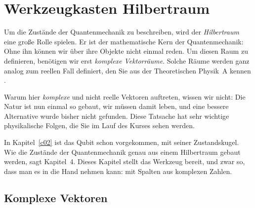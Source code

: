 %

\chapter{Werkzeugkasten Hilbertraum}\label{c03}

Um die Zustände der Quantenmechanik zu beschreiben, wird der \emph{Hilbertraum} eine große
Rolle spielen. Er ist der mathematische Kern der Quantenmechanik: Ohne ihn können wir über
ihre Objekte nicht einmal reden. Um diesen Raum zu definieren, benötigen wir erst
\emph{komplexe Vektorräume}. Solche Räume werden ganz analog zum reellen Fall definiert, den
Sie aus der Theoretischen Physik~A kennen .

Warum hier \emph{komplexe} und nicht reelle Vektoren auftreten, wissen wir nicht: Die Natur
ist nun einmal so gebaut, wir müssen damit leben, und eine bessere Alternative wurde bisher
nicht gefunden. Diese Tatsache hat sehr wichtige physikalische Folgen, die Sie im Lauf des
Kurses sehen werden.

In Kapitel~\ref{c02} ist das Qubit schon vorgekommen, mit seiner Zustandskugel. Wie die
Zustände der Quantenmechanik genau aus einem Hilbertraum gebaut werden, sagt Kapitel~4. Dieses
Kapitel stellt das Werkzeug bereit, und zwar so, dass man es in die Hand nehmen kann: mit
Spalten aus komplexen Zahlen.

\section{Komplexe Vektoren}\label{c03.s1}

